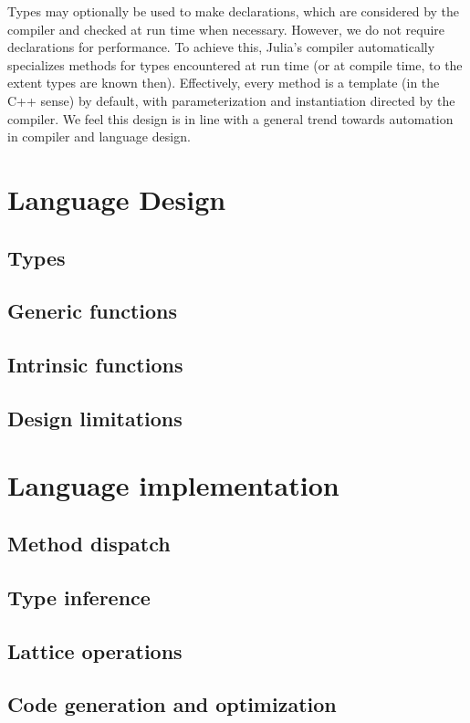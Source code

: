 \documentclass[11pt]{sigplanconf}
\begin{document}
Types may optionally be used to make declarations, which are considered by
the compiler and checked at run time when necessary. However, we do not
require declarations for performance. To achieve this, Julia's compiler
automatically specializes methods for types encountered at run time
(or at compile time, to the extent types are known then). Effectively,
every method is a template (in the C++ sense) by default, with
parameterization and instantiation directed by the compiler. We feel this
design is in line with a general trend towards automation in compiler
and language design.


\section{Language Design}

\subsection{Types}
\subsection{Generic functions}
\subsection{Intrinsic functions}
\subsection{Design limitations}

\section{Language implementation}
\subsection{Method dispatch}
\subsection{Type inference}
\subsection{Lattice operations}
\subsection{Code generation and optimization}
\end{document}
